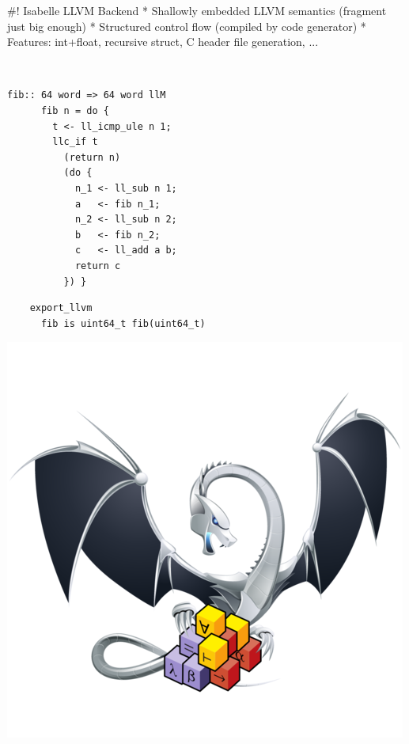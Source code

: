 \documentclass[fleqn]{beamer}
\begin{document}
#! Isabelle LLVM Backend
  * Shallowly embedded LLVM semantics (fragment just big enough)
  * Structured control flow (compiled by code generator)
  * Features: int+float, recursive struct, C header file generation, ...

  {\small
  \begin{minipage}{.05\textwidth}{\ }\end{minipage}
  \begin{minipage}{.45\textwidth}
    \begin{lstlisting}[escapechar=!]
      fib:: 64 word => 64 word llM
      fib n = do {
        t <- ll_icmp_ule n 1;
        llc_if t
          (return n)
          (do {
            n_1 <- ll_sub n 1;
            a   <- fib n_1;
            n_2 <- ll_sub n 2;
            b   <- fib n_2;
            c   <- ll_add a b;
            return c
          }) }
    \end{lstlisting}
  \end{minipage}%
  \begin{minipage}{.3\textwidth}
  \begin{lstlisting}
    export_llvm
      fib is uint64_t fib(uint64_t)
  \end{lstlisting}
  \includegraphics[width=\textwidth]{isabelle-llvm.png}
  \end{minipage}
  }
\end{document}
